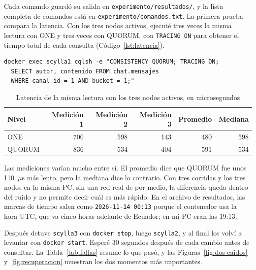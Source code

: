 \documentclass[11pt,a4paper]{article}
\begin{document}
Cada comando guardó su salida en \texttt{experimento/resultados/}, y la lista completa de comandos está en \texttt{experimento/comandos.txt}. La primera prueba compara la latencia. Con los tres nodos activos, ejecuté tres veces la misma lectura con ONE y tres veces con QUORUM, con \texttt{TRACING ON} para obtener el tiempo total de cada consulta (Código~\ref{lst:latencia}).

\begin{lstlisting}[caption={Lectura con QUORUM y trazado activado},label={lst:latencia}]
docker exec scylla1 cqlsh -e "CONSISTENCY QUORUM; TRACING ON;
  SELECT autor, contenido FROM chat.mensajes
  WHERE canal_id = 1 AND bucket = 1;"
\end{lstlisting}

\begin{table}[H]
  \centering
  \small
  \caption{Latencia de la misma lectura con los tres nodos activos, en microsegundos}
  \label{tab:latencia}
  \begin{tabular}{@{}lrrrrr@{}}
    \toprule
    \textbf{Nivel} & \textbf{Medición 1} & \textbf{Medición 2} & \textbf{Medición 3} & \textbf{Promedio} & \textbf{Mediana} \\
    \midrule
    ONE    & 700 & 598 & 143 & 480 & 598 \\
    QUORUM & 836 & 534 & 404 & 591 & 534 \\
    \bottomrule
  \end{tabular}
\end{table}

Las mediciones varían mucho entre sí. El promedio dice que QUORUM fue unos 110~$\mu$s más lento, pero la mediana dice lo contrario. Con tres corridas y los tres nodos en la misma PC, sin una red real de por medio, la diferencia queda dentro del ruido y no permite decir cuál es más rápido. En el archivo de resultados, las marcas de tiempo salen como \texttt{2026-11-14 00:13} porque el contenedor usa la hora UTC, que va cinco horas adelante de Ecuador; en mi PC eran las 19:13.

Después detuve \texttt{scylla3} con \texttt{docker stop}, luego \texttt{scylla2}, y al final los volví a levantar con \texttt{docker start}. Esperé 30 segundos después de cada cambio antes de consultar. La Tabla~\ref{tab:fallas} resume lo que pasó, y las Figuras~\ref{fig:dos-caidos} y~\ref{fig:recuperacion} muestran los dos momentos más importantes.
\end{document}
